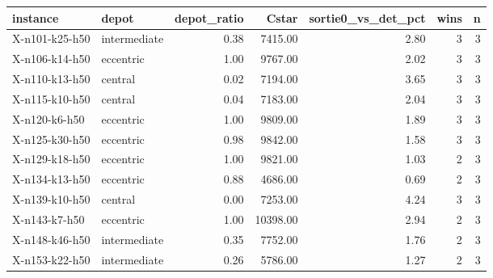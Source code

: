 \begin{tabular}{llrrrrr}
\toprule
instance & depot & depot\_ratio & Cstar & sortie0\_vs\_det\_pct & wins & n \\
\midrule
X-n101-k25-h50 & intermediate & 0.38 & 7415.00 & 2.80 & 3 & 3 \\
X-n106-k14-h50 & eccentric & 1.00 & 9767.00 & 2.02 & 3 & 3 \\
X-n110-k13-h50 & central & 0.02 & 7194.00 & 3.65 & 3 & 3 \\
X-n115-k10-h50 & central & 0.04 & 7183.00 & 2.04 & 3 & 3 \\
X-n120-k6-h50 & eccentric & 1.00 & 9809.00 & 1.89 & 3 & 3 \\
X-n125-k30-h50 & eccentric & 0.98 & 9842.00 & 1.58 & 3 & 3 \\
X-n129-k18-h50 & eccentric & 1.00 & 9821.00 & 1.03 & 2 & 3 \\
X-n134-k13-h50 & eccentric & 0.88 & 4686.00 & 0.69 & 2 & 3 \\
X-n139-k10-h50 & central & 0.00 & 7253.00 & 4.24 & 3 & 3 \\
X-n143-k7-h50 & eccentric & 1.00 & 10398.00 & 2.94 & 2 & 3 \\
X-n148-k46-h50 & intermediate & 0.35 & 7752.00 & 1.76 & 2 & 3 \\
X-n153-k22-h50 & intermediate & 0.26 & 5786.00 & 1.27 & 2 & 3 \\
\bottomrule
\end{tabular}
